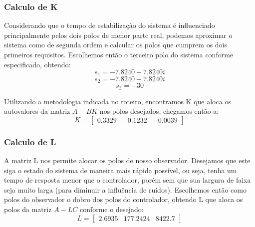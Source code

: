 \documentclass{article}
\begin{document}
\subsubsection{Calculo de K}
Considerando que o tempo de estabilização do sistema é influenciado principalmente pelos dois polos de menor parte real, podemos aproximar o sistema como de segunda ordem e calcular os polos que cumprem os dois primeiros requisitos. Escolhemos então o terceiro polo do sistema conforme especificado, obtendo:
\begin{equation}
	s_1=-7.8240 + 7.8240i
\end{equation}
\begin{equation}
	s_2=-7.8240 - 7.8240i
\end{equation}
\begin{equation}
	s_3=-30
\end{equation}

Utilizando a metodologia indicada no roteiro\cite{bb:roteiro}, encontramos K que aloca os autovalores da matriz $A - BK$ nos polos desejados, chegamos então a: 
\begin{equation}
\label{eq:matk}
K=
\begin{bmatrix}
0.3329 & -0.1232 & -0.0039
\end{bmatrix}
\end{equation}

\subsubsection{Calculo de L}
A matriz L nos permite alocar os polos de nosso observador. Desejamos que este siga o estado do sistema de maneira mais rápida possível, ou seja, tenha um tempo de resposta menor que o controlador, porém sem que sua largura de faixa seja muito larga (para diminuir a influência de ruídos). Escolhemos então como polos do observador o dobro dos polos do controlador, obtendo L que aloca os polos da matriz $A - LC$ conforme o desejado:
\begin{equation}
\label{eq:matl}
L=
\begin{bmatrix}
2.6935 & 177.2424 & 8422.7
\end{bmatrix}
\end{equation}
\end{document}
